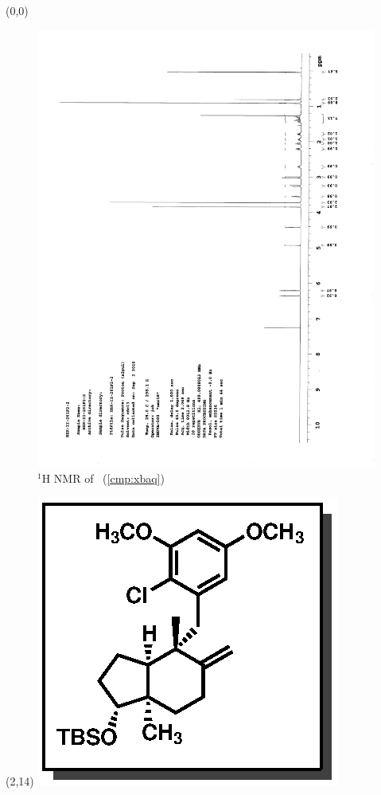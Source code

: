\begin{textblock}{20}(0,0)
\begin{figure}[htb]
\caption{$^1$H NMR of \CMPxbaq\ (\ref{cmp:xbaq})}
\includegraphics[scale=0.75, trim = 0mm 0mm 0mm 5mm,
clip]{chp_singlecarbon/images/nmr/xbaqH}
\vspace{-100pt}
\end{figure}
\end{textblock}
\begin{textblock}{1}(2,14)
\includegraphics[scale=0.8, angle=90]{chp_singlecarbon/images/xbaq}
\end{textblock}
